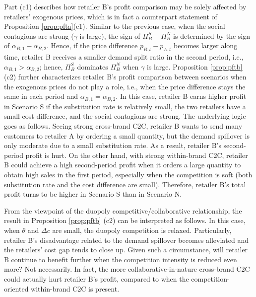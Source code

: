 \documentclass[nonblindrev,copyedit]{informs1}
\begin{document}
Part (c1) describes how retailer B's profit comparison may be solely affected by retailers' exogenous prices, which is in fact a counterpart statement of Proposition \ref{prop:pfta}(c1). Similar to the previous case, when the social contagions are strong ($\gamma$ is large), the sign of $\Pi^S_{B} - \Pi^N_{B}$ is determined by the sign of $\alpha_{B,1} - \alpha_{B,2}$. Hence, if the price difference $p_{B,t}-p_{A,t}$ becomes larger along time, retailer B receives a smaller demand split ratio in the second period, i.e., $\alpha_{B,1} > \alpha_{B,2}$; hence, $\Pi^S_{B}$ dominates $ \Pi^N_{B}$ when $\gamma$ is large.
Proposition \ref{prop:pftb}(c2) further characterizes retailer B's profit comparison between scenarios when the exogenous prices do not play a role, i.e., when the price difference stays the same in each period and $\alpha_{B,1} = \alpha_{B,2}$.
In this case, retailer B earns higher profit in Scenario S if the substitution rate is relatively small, the two retailers have a small cost difference, and the social contagions are strong. The underlying logic goes as follows. Seeing strong cross-brand C2C, retailer B wants to send many customers to retailer A by ordering a small quantity, but the demand spillover is only moderate due to a small substitution rate. As a result, retailer B's second-period profit is hurt. On the other hand, with strong within-brand C2C, retailer B could achieve a high second-period profit when it orders a large quantity to obtain high sales in the first period, especially when the competition is soft (both substitution rate and the cost difference are small). Therefore, retailer B's total profit turns to be higher in Scenario S than in Scenario N.

From the viewpoint of the duopoly competitive/collaborative relationship, the result in Proposition \ref{prop:pftb} (c2) can be interpreted as follows.
In this case, when $\theta$ and $\Delta c$ are small, the duopoly competition is relaxed. Particularly, retailer B's disadvantage related to the demand spillover becomes alleviated and the retailers' cost gap tends to close up. Given such a circumstance, will retailer B continue to benefit further when the competition intensity is reduced even more? Not necessarily. In fact, the more collaborative-in-nature cross-brand C2C could actually hurt retailer B's profit, compared to when the competition-oriented within-brand C2C is present.
\end{document}
